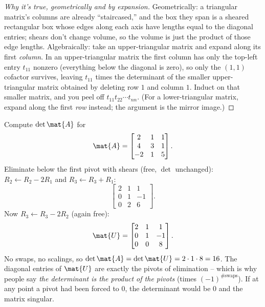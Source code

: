 \begin{proof}[Why it's true, geometrically and by expansion]
Geometrically: a triangular matrix's columns are already ``staircased,'' and the
box they span is a sheared rectangular box whose edges along each axis have lengths
equal to the diagonal entries; shears don't change volume, so the volume is just
the product of those edge lengths. Algebraically: take an upper-triangular matrix
and expand along its first \emph{column}. In an upper-triangular matrix the first
column has only the top-left entry $t_{11}$ nonzero (everything below the diagonal
is zero), so only the $(1,1)$ cofactor survives, leaving $t_{11}$ times the
determinant of the smaller upper-triangular matrix obtained by deleting row $1$ and
column $1$. Induct on that smaller matrix, and you peel off
$t_{11}t_{22}\cdots t_{nn}$. (For a lower-triangular matrix, expand along the first
\emph{row} instead; the argument is the mirror image.)
\end{proof}

\begin{example}
\label{ch21:ex-elim}
Compute $\det\mat{A}$ for
\[
  \mat{A} = \begin{bmatrix} 2 & 1 & 1 \\ 4 & 3 & 1 \\ -2 & 1 & 5 \end{bmatrix}.
\]
Eliminate below the first pivot with shears (free, $\det$ unchanged):
$R_2 \leftarrow R_2 - 2R_1$ and $R_3 \leftarrow R_3 + R_1$:
\[
  \begin{bmatrix} 2 & 1 & 1 \\ 0 & 1 & -1 \\ 0 & 2 & 6 \end{bmatrix}.
\]
Now $R_3 \leftarrow R_3 - 2R_2$ (again free):
\[
  \mat{U} = \begin{bmatrix} 2 & 1 & 1 \\ 0 & 1 & -1 \\ 0 & 0 & 8 \end{bmatrix}.
\]
No swaps, no scalings, so $\det\mat{A} = \det\mat{U} = 2\cdot 1\cdot 8 = 16$. The
diagonal entries of $\mat{U}$ are exactly the pivots of elimination -- which is why
people say \emph{the determinant is the product of the pivots} (times $(-1)^{\#
\text{swaps}}$). If at any point a pivot had been forced to $0$, the determinant
would be $0$ and the matrix singular.
\end{example}

